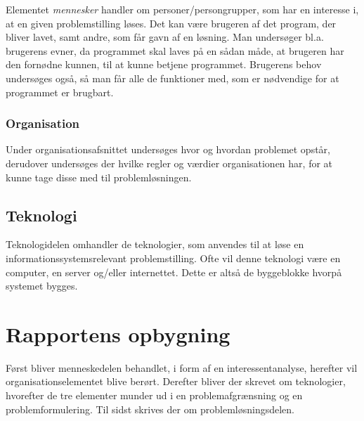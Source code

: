 Elementet \textit{mennesker} handler om personer/persongrupper, som har en interesse i, at en given
problemstilling løses. Det kan være brugeren af det program, der bliver lavet, samt andre, som får gavn af en
løsning. Man undersøger bl.a. brugerens evner, da programmet skal laves på en sådan måde, at brugeren har den
fornødne kunnen, til at kunne betjene programmet. Brugerens behov undersøges også, så man får alle de
funktioner med, som er nødvendige for at programmet er brugbart.


\subsubsection{Organisation}\label{subsec:organisation}

Under organisationsafsnittet undersøges hvor og hvordan problemet opstår, derudover undersøges der hvilke
regler og værdier organisationen har, for at kunne tage disse med til problemløsningen.


\subsection{Teknologi}\label{subsec:Teknologi}

Teknologidelen omhandler de teknologier, som anvendes til at løse en informationssystemsrelevant
problemstilling. Ofte vil denne teknologi være en computer,
en server og/eller internettet. Dette er altså de byggeblokke hvorpå systemet bygges.



\section{Rapportens opbygning}\label{sec:rapportens-opbygning}

Først bliver menneskedelen behandlet, i form af en interessentanalyse, herefter vil organisationselementet
blive berørt. Derefter bliver der skrevet om teknologier, hvorefter de tre elementer munder ud i en
problemafgrænsning og en problemformulering. Til sidst skrives der om problemløsningsdelen. 
